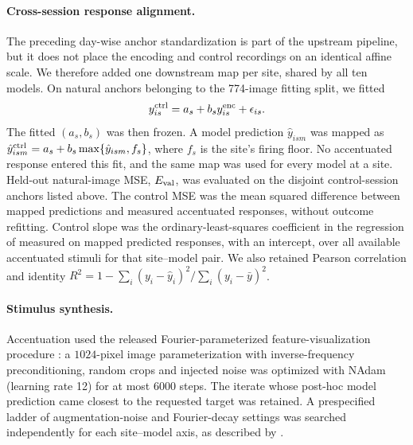 \paragraph{Cross-session response alignment.}
The preceding day-wise anchor standardization is part of the upstream
pipeline, but it does not place the encoding and control recordings on an
identical affine scale.  We therefore added one downstream map per site,
shared by all ten models.  On natural anchors belonging to the 774-image
fitting split, we fitted
\begin{equation}
 y^{\rm ctrl}_{is}=a_s+b_s y^{\rm enc}_{is}+\epsilon_{is}.
 \label{eq:app-cross-session-affine}
\end{equation}
The fitted $(a_s,b_s)$ was then frozen.  A model prediction $\hat y_{ism}$ was
mapped as
$\hat y^{\rm ctrl}_{ism}=a_s+b_s\max\{\hat y_{ism},f_s\}$, where $f_s$ is the
site's firing floor.  No accentuated response entered this fit, and the same
map was used for every model at a site.  Held-out natural-image MSE,
$E_{\rm val}$, was evaluated on the disjoint control-session anchors listed
above.  The control MSE was the mean squared difference between mapped
predictions and measured accentuated responses, without outcome refitting.
Control slope was the ordinary-least-squares coefficient in the regression of
measured on mapped predicted responses, with an intercept, over all available
accentuated stimuli for that site--model pair.  We also retained Pearson
correlation and identity
$R^2=1-\sum_i(y_i-\hat y_i)^2/\sum_i(y_i-\bar y)^2$.

\paragraph{Stimulus synthesis.}
Accentuation used the released Fourier-parameterized feature-visualization
procedure \citep{hamblin2024feature}: a $1024$-pixel image parameterization
with inverse-frequency preconditioning, random crops and injected noise was
optimized with NAdam (learning rate 12) for at most 6000 steps.  The iterate whose post-hoc model prediction came closest to the requested
target was retained.  A prespecified ladder of augmentation-noise and Fourier-decay
settings was searched independently for each site--model axis, as described by
\citetPW.

